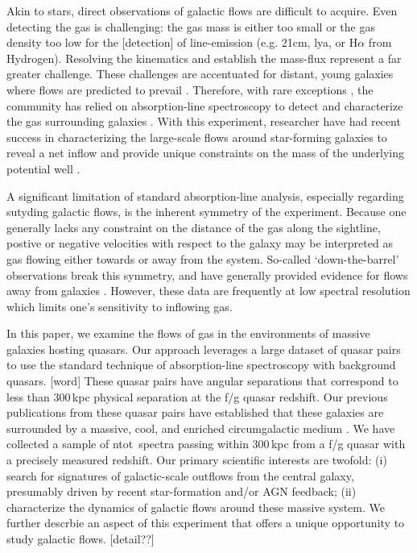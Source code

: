 \documentclass[iop]{emulateapj}
\begin{document}
Akin to stars, direct observations of galactic flows are
difficult to acquire.  Even detecting the gas is challenging:
the gas mass is either too small or the gas density too low
for the [detection] of line-emission (e.g. 21cm, lya,
or H$\alpha$ from Hydrogen).  Resolving the kinematics
and establish the mass-flux represent a far greater challenge.
These challenges are accentuated for distant, young galaxies
where flows are predicted to prevail \citep{keres,fumagalli}.
Therefore, with rare exceptions \citep[e.g.][]{slug,jackpot},
the community has relied on absorption-line spectroscopy
to detect and characterize the gas surrounding galaxies
\citep[e.g.][]{bergeron,steidel10,pro11,tumlinson13}.
With this experiment, researcher have had recent success
in characterizing the large-scale flows around star-forming
galaxies to reveal a net inflow \cite{rakic13} and
provide unique constraints on the mass of the underlying
potential well \cite{rakic14}.

A significant limitation of standard absorption-line
analysis, especially regarding sutyding galactic flows,
is the inherent symmetry of the experiment.
Because one generally lacks any constraint on the distance
of the gas along the sightline,
postive or negative velocities with respect to the
galaxy may be interpreted as gas flowing either towards
or away from the system.
So-called `down-the-barrel' observations break this
symmetry, and have generally provided evidence for flows
away from galaxies \citep{rupke,martin,weiner,rubin}.
However, these data are frequently at low spectral resolution
which limits one's sensitivity to inflowing gas.

In this paper, we examine the flows of gas in the environments
of massive galaxies hosting quasars.  Our approach leverages
a large dataset of quasar pairs \citep{hennawi}
to use the standard technique of absorption-line spectroscopy
with background quasars. [word]
These quasar pairs have angular
separations that correspond to less than 300\,kpc physical
separation at the f/g quasar redshift.
Our previous publications from these quasar pairs
have established that these galaxies are surrounded
by a massive, cool, and enriched circumgalactic medium
\citep{QPQ1,QPQ5,QPQ6,QPQ7}.
We have collected a sample of ntot~spectra passing within
300\,kpc from a f/g quasar with a precisely measured
redshift.  Our primary scientific interests are twofold:
(i) search for signatures of galactic-scale outflows from the
central galaxy, presumably driven by recent star-formation
and/or AGN feedback;
(ii) characterize the dynamics of galactic flows around these
massive system.  We further descrbie an aspect of this
experiment that offers a unique opportunity to study galactic
flows. [detail??]
\end{document}
